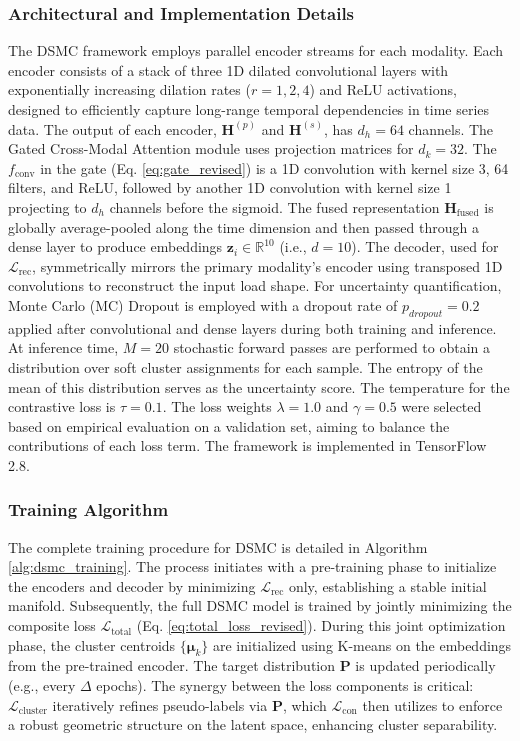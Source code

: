 \documentclass[journal]{IEEEtran}
\begin{document}
\subsubsection{Architectural and Implementation Details}
The DSMC framework employs parallel encoder streams for each modality. Each encoder consists of a stack of three 1D dilated convolutional layers with exponentially increasing dilation rates ($r=1, 2, 4$) and ReLU activations, designed to efficiently capture long-range temporal dependencies in time series data. The output of each encoder, $\mathbf{H}^{(p)}$ and $\mathbf{H}^{(s)}$, has $d_h=64$ channels. The Gated Cross-Modal Attention module uses projection matrices for $d_k=32$. The $f_{\text{conv}}$ in the gate (Eq. \ref{eq:gate_revised}) is a 1D convolution with kernel size 3, 64 filters, and ReLU, followed by another 1D convolution with kernel size 1 projecting to $d_h$ channels before the sigmoid. The fused representation $\mathbf{H}_{\text{fused}}$ is globally average-pooled along the time dimension and then passed through a dense layer to produce embeddings $\mathbf{z}_i \in \mathbb{R}^{10}$ (i.e., $d=10$). The decoder, used for $\mathcal{L}_{\text{rec}}$, symmetrically mirrors the primary modality's encoder using transposed 1D convolutions to reconstruct the input load shape.
For uncertainty quantification, Monte Carlo (MC) Dropout \cite{mc_dropout_gal} is employed with a dropout rate of $p_{dropout}=0.2$ applied after convolutional and dense layers during both training and inference. At inference time, $M=20$ stochastic forward passes are performed to obtain a distribution over soft cluster assignments for each sample. The entropy of the mean of this distribution serves as the uncertainty score. The temperature for the contrastive loss is $\tau=0.1$. The loss weights $\lambda=1.0$ and $\gamma=0.5$ were selected based on empirical evaluation on a validation set, aiming to balance the contributions of each loss term. The framework is implemented in TensorFlow 2.8.

\subsubsection{Training Algorithm}
The complete training procedure for DSMC is detailed in Algorithm \ref{alg:dsmc_training}. The process initiates with a pre-training phase to initialize the encoders and decoder by minimizing $\mathcal{L}_{\text{rec}}$ only, establishing a stable initial manifold. Subsequently, the full DSMC model is trained by jointly minimizing the composite loss $\mathcal{L}_{\text{total}}$ (Eq. \ref{eq:total_loss_revised}). During this joint optimization phase, the cluster centroids $\{\boldsymbol{\mu}_k\}$ are initialized using K-means on the embeddings from the pre-trained encoder. The target distribution $\mathbf{P}$ is updated periodically (e.g., every $\Delta$ epochs). The synergy between the loss components is critical: $\mathcal{L}_{\text{cluster}}$ iteratively refines pseudo-labels via $\mathbf{P}$, which $\mathcal{L}_{\text{con}}$ then utilizes to enforce a robust geometric structure on the latent space, enhancing cluster separability.
\end{document}
